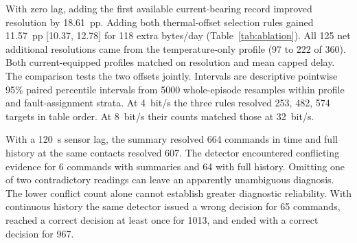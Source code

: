 With zero lag, adding the first available current-bearing record improved resolution by 18.61~pp. Adding both thermal-offset selection rules gained 11.57~pp [10.37, 12.78] for 118 extra bytes/day (Table~\ref{tab:ablation}). All 125 net additional resolutions came from the temperature-only profile (97 to 222 of 360). Both current-equipped profiles matched on resolution and mean capped delay. The comparison tests the two offsets jointly. Intervals are descriptive pointwise 95\% paired percentile intervals from 5000 whole-episode resamples within profile and fault-assignment strata. At 4~bit/s the three rules resolved 253, 482, 574 targets in table order. At 8~bit/s their counts matched those at 32~bit/s.

With a 120~s sensor lag, the summary resolved 664 commands in time and full history at the same contacts resolved 607. The detector encountered conflicting evidence for 6 commands with summaries and 64 with full history. Omitting one of two contradictory readings can leave an apparently unambiguous diagnosis. The lower conflict count alone cannot establish greater diagnostic reliability. With continuous history the same detector issued a wrong decision for 65 commands, reached a correct decision at least once for 1013, and ended with a correct decision for 967.
